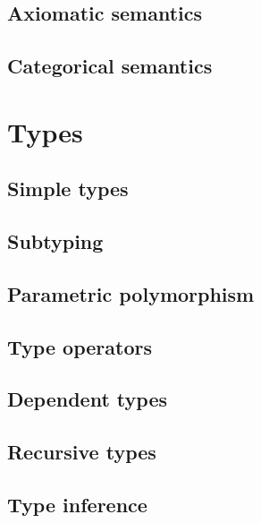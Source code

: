 \documentclass[oneside]{book}
\begin{document}
    \chapter{Axiomatic semantics}

    \chapter{Categorical semantics}

  \part{Types}

    \chapter{Simple types}

    \chapter{Subtyping}

    \chapter{Parametric polymorphism}

    \chapter{Type operators}

    \chapter{Dependent types}

    \chapter{Recursive types}

    \chapter{Type inference}

  \backmatter

  \printbibliography[heading=bibintoc,title=References]

  \printindex
\end{document}
